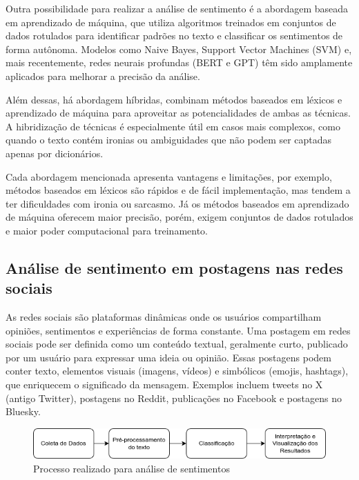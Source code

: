 \documentclass[
	12pt,				%
	oneside,			%
	a4paper,			%
	english,			%
	french,				%
	spanish,			%
	brazil				%
	]{abntex2}
\begin{document}
Outra possibilidade para realizar a análise de sentimento é a abordagem
baseada em aprendizado de máquina, que utiliza algoritmos treinados em
conjuntos de dados rotulados para identificar padrões no texto e
classificar os sentimentos de forma autônoma. Modelos como Naive Bayes,
Support Vector Machines (SVM) e, mais recentemente, redes neurais
profundas (BERT e GPT) têm sido amplamente aplicados para melhorar a
precisão da análise.

Além dessas, há abordagem híbridas, combinam métodos baseados em léxicos
e aprendizado de máquina para aproveitar as potencialidades de ambas as
técnicas. A hibridização de técnicas é especialmente útil em casos mais
complexos, como quando o texto contém ironias ou ambiguidades que não
podem ser captadas apenas por dicionários.

Cada abordagem mencionada apresenta vantagens e limitações, por exemplo,
métodos baseados em léxicos são rápidos e de fácil implementação, mas
tendem a ter dificuldades com ironia ou sarcasmo. Já os métodos baseados
em aprendizado de máquina oferecem maior precisão, porém, exigem
conjuntos de dados rotulados e maior poder computacional para
treinamento.

\hypertarget{anuxe1lise-de-sentimento-em-postagens-nas-redes-sociais}{%
\subsection{Análise de sentimento em postagens nas redes
sociais}\label{anuxe1lise-de-sentimento-em-postagens-nas-redes-sociais}}

As redes sociais são plataformas dinâmicas onde os usuários compartilham
opiniões, sentimentos e experiências de forma constante. Uma postagem em
redes sociais pode ser definida como um conteúdo textual, geralmente
curto, publicado por um usuário para expressar uma ideia ou opinião.
Essas postagens podem conter texto, elementos visuais (imagens, vídeos)
e simbólicos (emojis, hashtags), que enriquecem o significado da
mensagem. Exemplos incluem tweets no X (antigo Twitter), postagens no
Reddit, publicações no Facebook e postagens no Bluesky.

\begin{figure}[htbp]
\hypertarget{processo_analise_sentimentos}{%
\caption{Processo realizado para análise de sentimentos}\label{processo_analise_sentimentos}
\begin{center}
\includegraphics[scale=0.7]{imagens/processo_analise_sentimentos.png}
\end{center}
}
\end{figure}
\end{document}
